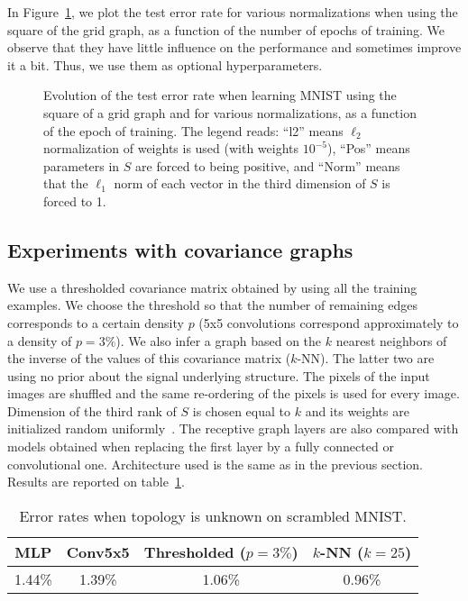 In Figure~\ref{functionofepoch}, we plot the test error rate for various normalizations when using the square of the grid graph, as a function of the number of epochs of training. We observe that they have little influence on the performance and sometimes improve it a bit. Thus, we use them as optional hyperparameters.

\begin{figure}[H]
  \begin{center}
    
  \end{center}
  \caption{Evolution of the test error rate when learning MNIST using the square of a grid graph and for various normalizations, as a function of the epoch of training. The legend reads: ``l2'' means $\ell_2$ normalization of weights is used (with weights $10^{-5}$), ``Pos'' means parameters in $S$ are forced to being positive, and ``Norm'' means that the $\ell_1$ norm of each vector in the third dimension of $S$ is forced to 1.}
  \label{functionofepoch}
\end{figure}

\subsection{Experiments with covariance graphs}

We use a thresholded covariance matrix obtained by using all the training examples. We choose the threshold so that the number of remaining edges corresponds to a certain density $p$ (5x5 convolutions correspond approximately to a density of $p=3\%$). We also infer a graph based on the $k$ nearest neighbors of the inverse of the values of this covariance matrix ($k$-NN). The latter two are using no prior about the signal underlying structure. The pixels of the input images are shuffled and the same re-ordering of the pixels is used for every image. Dimension of the third rank of $S$ is chosen equal to $k$ and its weights are initialized random uniformly~\cite{glorot2010understanding}.
 The receptive graph layers are also compared with models obtained when replacing the first layer by a fully connected or convolutional one. Architecture used is the same as in the previous section. Results are reported on table~\ref{covar}.

\begin{table}[H]
  \caption{Error rates when topology is unknown on scrambled MNIST.}
  \begin{center}
    \bgroup
    \def\arraystretch{1.5}%
    \begin{tabular}{|c|c|c|c|}
      \hline
      MLP & Conv5x5 & Thresholded ($p=3\%$) & $k$-NN ($k=25$)\\
      \hline
      1.44\% & 1.39\% & 1.06\% & 0.96\%\\
      \hline
    \end{tabular}
    \egroup
  \end{center}
  \label{covar}
  \end{table}

